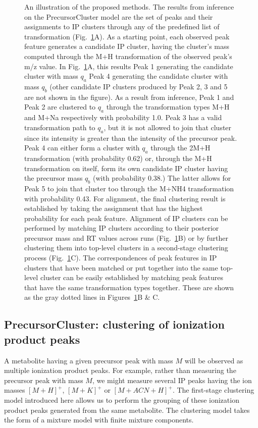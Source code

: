 \begin{figure}[!htbp]
\centering\caption{\label{fig:01} An illustration of the proposed methods. The results from inference on the PrecursorCluster model are the set of peaks and their assignments to IP clusters through any of the predefined list of transformation (Fig.~\ref{fig:01}A). As a starting point, each observed peak feature generates a candidate IP cluster, having the cluster's mass computed through the M+H transformation of the observed peak's m/z value. In Fig.~\ref{fig:01}A, this results Peak 1 generating the candidate cluster with mass $q_a$ Peak 4 generating the candidate cluster with mass $q_b$ (other candidate IP clusters produced by Peak 2, 3 and 5 are not shown in the figure). As a result from inference, Peak 1 and Peak 2 are clustered to $q_a$ through the transformation types M+H and M+Na respectively with probability 1.0. Peak 3 has a valid transformation path to $q_a$, but it is not allowed to join that cluster since its intensity is greater than the intensity of the precursor peak. Peak 4 can either form a cluster with $q_a$ through the 2M+H transformation (with probability 0.62) or, through the M+H transformation on itself, form its own candidate IP cluster having the precursor mass $q_b$ (with probability 0.38.) The latter allows for Peak 5 to join that cluster too through the M+NH4 transformation with probability 0.43. For alignment, the final clustering result is established by taking the assignment that has the highest probability for each peak feature. Alignment of IP clusters can be performed by matching IP clusters according to their posterior precursor mass and RT values across runs (Fig.~\ref{fig:01}B) or by further clustering them into top-level clusters in a second-stage clustering process (Fig.~\ref{fig:01}C). The correspondences of peak features in IP clusters that have been matched or put together into the same top-level cluster can be easily established by matching peak features that have the same transformation types together. These are shown as the gray dotted lines in Figures~\ref{fig:01}B \& C.}
\end{figure}

\subsection{PrecursorCluster: clustering of ionization product peaks\label{sub:ip-clustering}}

A metabolite having a given precursor peak with mass $M$ will be observed as multiple ionization product peaks. For example, rather than measuring the precursor peak with mass $M$, we might measure several IP peaks having the ion masses $[M+H]^+$, $[M+K]^+$ or $[M+ACN+H]^+$. The first-stage clustering model introduced here allows us to perform the grouping of these ionization product peaks generated from the same metabolite. The clustering model takes the form of a mixture model with finite mixture components. 

